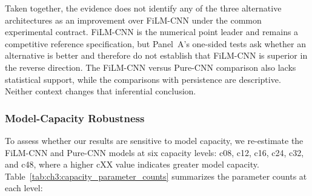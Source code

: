 Taken together, the evidence does not identify any of the three alternative
architectures as an improvement over FiLM-CNN under the common experimental
contract. FiLM-CNN is the numerical point leader and remains a competitive
reference specification, but Panel~A's one-sided tests ask whether an
alternative is better and therefore do not establish that FiLM-CNN is superior
in the reverse direction. The FiLM-CNN versus Pure-CNN comparison also lacks
statistical support, while the comparisons with persistence are descriptive.
Neither context changes that inferential conclusion.




\subsubsection*{Model-Capacity Robustness}

To assess whether our results are sensitive to model capacity, we re-estimate
the FiLM-CNN and Pure-CNN models at six capacity levels: c08, c12, c16, c24,
c32, and c48, where a higher cXX value indicates greater model capacity.
Table~\ref{tab:ch3:capacity_parameter_counts} summarizes the parameter counts
at each level:

